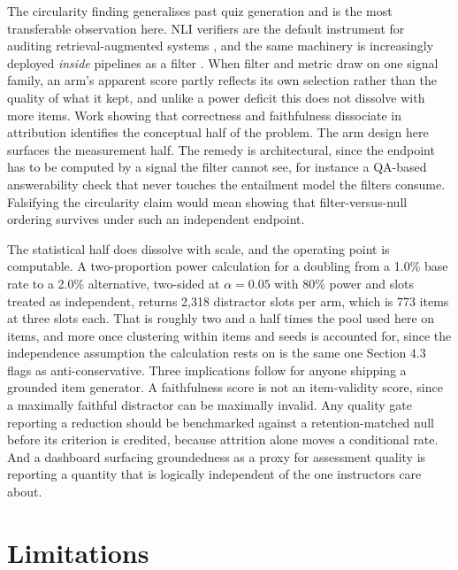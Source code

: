 \documentclass[11pt]{article}
\begin{document}
The circularity finding generalises past quiz generation and is the most transferable observation here. NLI verifiers are the default instrument for auditing retrieval-augmented systems \citep{laban2022summac,honovich2022true,es2024ragas}, and the same machinery is increasingly deployed \emph{inside} pipelines as a filter \citep{lei2023chain,wu2024synchronous}. When filter and metric draw on one signal family, an arm's apparent score partly reflects its own selection rather than the quality of what it kept, and unlike a power deficit this does not dissolve with more items. Work showing that correctness and faithfulness dissociate in attribution \citep{wallat2025correctness,stolfo2024groundedness} identifies the conceptual half of the problem. The arm design here surfaces the measurement half. The remedy is architectural, since the endpoint has to be computed by a signal the filter cannot see, for instance a QA-based answerability check \citep{wang2020asking,fabbri2022qafacteval} that never touches the entailment model the filters consume. Falsifying the circularity claim would mean showing that filter-versus-null ordering survives under such an independent endpoint.

The statistical half does dissolve with scale, and the operating point is computable. A two-proportion power calculation for a doubling from a 1.0\% base rate to a 2.0\% alternative, two-sided at $\alpha = 0.05$ with 80\% power and slots treated as independent, returns 2,318 distractor slots per arm, which is 773 items at three slots each. That is roughly two and a half times the pool used here on items, and more once clustering within items and seeds is accounted for, since the independence assumption the calculation rests on is the same one Section 4.3 flags as anti-conservative. Three implications follow for anyone shipping a grounded item generator. A faithfulness score is not an item-validity score, since a maximally faithful distractor can be maximally invalid. Any quality gate reporting a reduction should be benchmarked against a retention-matched null before its criterion is credited, because attrition alone moves a conditional rate. And a dashboard surfacing groundedness as a proxy for assessment quality is reporting a quantity that is logically independent of the one instructors care about.

\section{Limitations}
\end{document}
